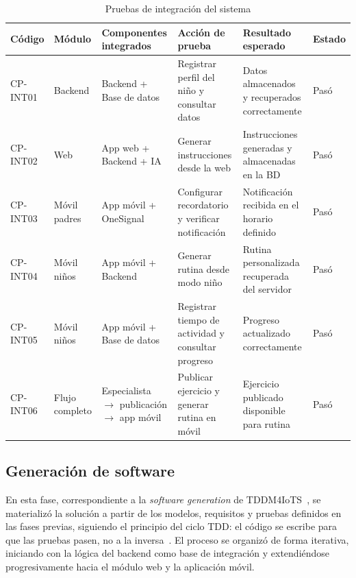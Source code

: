 				\begin{table}[H]
					\centering\small
					\caption{Pruebas de integración del sistema}
					\label{tab:pruebas_integracion}
					\begin{tabular}{p{1.8cm}p{2cm}p{3.5cm}p{3cm}p{2.5cm}p{1.5cm}}
						\hline
						\textbf{Código} & \textbf{Módulo} & \textbf{Componentes integrados} & \textbf{Acción de prueba} & \textbf{Resultado esperado} & \textbf{Estado}\\
						\hline
						CP-INT01 & Backend & Backend + Base de datos & Registrar perfil del niño y consultar datos & Datos almacenados y recuperados correctamente & Pasó\\
						CP-INT02 & Web & App web + Backend + IA & Generar instrucciones desde la web & Instrucciones generadas y almacenadas en la BD & Pasó\\
						CP-INT03 & Móvil padres & App móvil + OneSignal & Configurar recordatorio y verificar notificación & Notificación recibida en el horario definido & Pasó\\
						CP-INT04 & Móvil niños & App móvil + Backend & Generar rutina desde modo niño & Rutina personalizada recuperada del servidor & Pasó\\
						CP-INT05 & Móvil niños & App móvil + Base de datos & Registrar tiempo de actividad y consultar progreso & Progreso actualizado correctamente & Pasó\\
						CP-INT06 & Flujo completo & Especialista $\rightarrow$ publicación $\rightarrow$ app móvil & Publicar ejercicio y generar rutina en móvil & Ejercicio publicado disponible para rutina & Pasó\\
						\hline
					\end{tabular}
				\end{table}
				\tblnote

			\subsection{Generación de software}
				\label{sec:sofgen}
				En esta fase, correspondiente a la \textit{software generation} de TDDM4IoTS~\cite{GuerreroUlloa2024}, se materializó la solución a partir de los modelos, requisitos y pruebas definidos en las fases previas, siguiendo el principio del ciclo TDD: el código se escribe para que las pruebas pasen, no a la inversa~\cite{GuerreroUlloa2024,Fowler2002}. El proceso se organizó de forma iterativa, iniciando con la lógica del backend como base de integración y extendiéndose progresivamente hacia el módulo web y la aplicación móvil.
				
